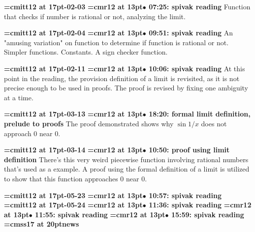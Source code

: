 {\medskip\noindent\bf\font\titlefont=cmitt12 at 17pt-02-03}\medskip
{\smallskip\noindent\bf\font\titlefont=cmr12 at 13pt\titlefont $\bullet$ 07:25: spivak reading}\smallskip
Function that checks if number is rational or not, analyzing the limit.
\par

{\medskip\noindent\bf\font\titlefont=cmitt12 at 17pt-02-04}\medskip
{\smallskip\noindent\bf\font\titlefont=cmr12 at 13pt\titlefont $\bullet$ 09:51: spivak reading}\smallskip
An "amusing variation" on function to determine if function is rational or not. Simpler functions. Constants. A sign checker function.
\par

{\medskip\noindent\bf\font\titlefont=cmitt12 at 17pt-02-11}\medskip
{\smallskip\noindent\bf\font\titlefont=cmr12 at 13pt\titlefont $\bullet$ 10:06: spivak reading}\smallskip
At this point in the reading, the provision definition of a limit is revisited, as it is not precise enough to be used in proofs. The proof is revised by fixing one ambiguity at a time.
\par

{\medskip\noindent\bf\font\titlefont=cmitt12 at 17pt-03-13}\medskip
{\smallskip\noindent\bf\font\titlefont=cmr12 at 13pt\titlefont $\bullet$ 18:20: formal limit definition, prelude to proofs}\smallskip
The proof demonstrated shows why $\sin 1/x$ does not approach 0 near 0.
\par

{\medskip\noindent\bf\font\titlefont=cmitt12 at 17pt-03-14}\medskip
{\smallskip\noindent\bf\font\titlefont=cmr12 at 13pt\titlefont $\bullet$ 10:50: proof using limit definition}\smallskip
There's this very weird piecewise function involving rational numbers that's used as a example. A proof using the formal definition of a limit is utilized to show that this function approaches 0 near 0.
\par

{\medskip\noindent\bf\font\titlefont=cmitt12 at 17pt-05-23}\medskip
{\smallskip\noindent\bf\font\titlefont=cmr12 at 13pt\titlefont $\bullet$ 10:57: spivak reading}\smallskip
{\medskip\noindent\bf\font\titlefont=cmitt12 at 17pt-05-24}\medskip
{\smallskip\noindent\bf\font\titlefont=cmr12 at 13pt\titlefont $\bullet$ 11:36: spivak reading}\smallskip
{\smallskip\noindent\bf\font\titlefont=cmr12 at 13pt\titlefont $\bullet$ 11:55: spivak reading}\smallskip
{\smallskip\noindent\bf\font\titlefont=cmr12 at 13pt\titlefont $\bullet$ 15:59: spivak reading}\smallskip
{}
{\medskip\noindent\bf\font\titlefont=cmss17 at 20pt\titlefont news}\medskip

